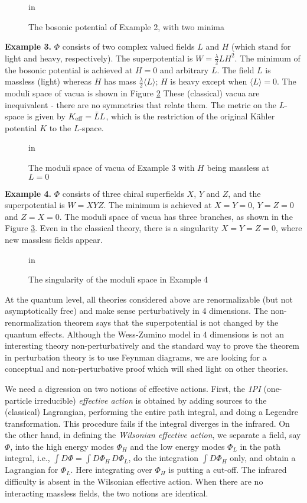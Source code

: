 \documentclass[lecture]{qft-l}
\newcommand{\lam}{\lambda}
\newcommand{\PHI}{\varPhi}
\newcommand{\bef}{\begin{figure}[h]
		\vspace{3ex}}
\newcommand{\enf}{\end{figure}}
\newcommand{\bra}{\langle}
\newcommand{\ket}{\rangle}
\newcommand{\eff}{_{{\rm eff}}}
\newcommand{\ka}{K\"ahler }
\numberwithin{figure}{chapter}
\begin{document}
\bef
{} in
\centerline{}
\caption{\protect\label{phi}The bosonic potential of Example 2, 
with two minima}
\enf

\medskip\noindent
{\bf Example 3.} $\PHI$ consists of two complex valued fields $L$ and $H$
(which stand for light and heavy, respectively).
The superpotential is $W=\frac{\lam}{2}LH^2$.
The minimum of the bosonic potential is achieved at $H=0$ and arbitrary $L$.
The field $L$ is massless (light) whereas $H$ has mass 
$\frac{\lam}{2}\bra L\ket$; $H$ is heavy except when $\bra L\ket=0$.
The moduli space of vacua is shown in Figure \ref{H=0}
These (classical) vacua are inequivalent - there are no symmetries that 
relate them.
The metric on the $L$-space is given by $K\eff=\bar{L}L$,
which is the restriction of the original \ka potential $K$ to the $L$-space.
	
	\bef
{} in
\centerline{}
\vspace{1em}
\caption{\protect\label{H=0}The moduli space of vacua of Example 3 with
$H$ being massless at $L=0$}
	\enf

\medskip\noindent
{\bf Example 4.} $\PHI$ consists of three chiral superfields $X$, $Y$ and $Z$,
and the superpotential is $W=XYZ$.
The minimum is achieved at $X=Y=0$, $Y=Z=0$ and $Z=X=0$.
The moduli space of vacua has three branches, as shown in the Figure \ref{XYZ}.
Even in the classical theory, there is a singularity $X=Y=Z=0$, where 
new massless fields appear.

	\bef
{} in
\centerline{}
\caption{\protect\label{XYZ}The singularity of the moduli space in Example 4} 
	\enf

At the quantum level, all theories considered above are renormalizable
(but not asymptotically free) and make sense perturbatively in 4 dimensions.
The non-renormalization theorem says that the superpotential is not 
changed by the quantum effects.
Although the Wess-Zumino model in 4 dimensions is not an interesting theory
non-perturbatively and the standard way to prove the theorem in perturbation
theory is to use Feynman diagrams, we are looking for a conceptual and 
non-perturbative proof which will shed light on other theories.

We need a digression on two notions of effective actions.
First, the {\em 1PI} (one-particle irreducible) {\em effective action}
is obtained by adding sources to the (classical) Lagrangian, performing 
the entire path integral, and doing a Legendre transformation.
This procedure fails if the integral diverges in the infrared.
On the other hand, in defining the {\em Wilsonian effective action}, 
we separate a field, say $\PHI$, into the high energy modes $\PHI_H$ and
the low energy modes $\PHI_L$ in the path integral, i.e.,
$\int D\PHI=\int D\PHI_H\,D\PHI_L$, do the integration $\int D\PHI_H$ only,
and obtain a Lagrangian for $\PHI_L$.
Here integrating over $\PHI_H$ is putting a cut-off.
The infrared difficulty is absent in the Wilsonian effective action.
When there are no interacting massless fields, the two notions are identical.
\end{document}
